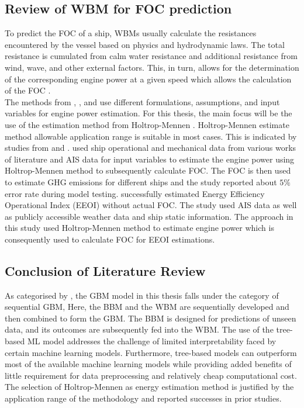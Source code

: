 \subsection{Review of WBM for FOC prediction}\label{sec:wbm_review}

To predict the FOC of a ship, WBMs usually calculate the resistances encountered by the vessel based on physics and hydrodynamic laws. The total resistance is cumulated from calm water resistance and additional resistance from wind, wave, and other external factors. This, in turn, allows for the determination of the corresponding engine power at a given speed which allows the calculation of the FOC .\\

The methods from , , and  use different formulations, assumptions, and input variables for engine power estimation. For this thesis, the main focus will be the use of the estimation method from Holtrop-Mennen . Holtrop-Mennen estimate method allowable application range is suitable in most cases. This is indicated by studies from  and .  used ship operational and mechanical data from various works of literature and AIS data for input variables to estimate the engine power using Holtrop-Mennen method to subsequently calculate FOC. The FOC is then used to estimate GHG emissions for different ships and the study reported about $5\%$ error rate during model testing.  successfully estimated Energy Efficiency Operational Index (EEOI) without actual FOC. The study used AIS data as well as publicly accessible weather data and ship static information. The approach in this study used Holtrop-Mennen method to estimate engine power which is consequently used to calculate FOC for EEOI estimations.\\ 

\subsection{Conclusion of Literature Review}\label{sec:lit_review_conclusion}

As categorised by , the GBM model in this thesis falls under the category of sequential GBM, Here, the BBM and the WBM are sequentially developed and then combined to form the GBM. The BBM is designed for predictions of unseen data, and its outcomes are subsequently fed into the WBM. The use of the tree-based ML model addresses the challenge of limited interpretability faced by certain machine learning models. Furthermore, tree-based models can outperform most of the available machine learning models while providing added benefits of little requirement for data preprocessing and relatively cheap computational cost. The selection of Holtrop-Mennen as energy estimation method is justified by the application range of the methodology and reported successes in prior studies.\\ 


